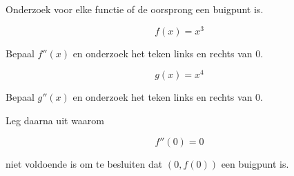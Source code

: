 \documentclass{ximera}
\begin{document}
\begin{oefening}{\oefU\ESS}

Onderzoek voor elke functie of de oorsprong een buigpunt is.

\begin{question}

\[
f(x)=x^3
\]

Bepaal $f''(x)$ en onderzoek het teken links en rechts van $0$.

\end{question}

\begin{question}

\[
g(x)=x^4
\]

Bepaal $g''(x)$ en onderzoek het teken links en rechts van $0$.

\end{question}

Leg daarna uit waarom

\[
f''(0)=0
\]

niet voldoende is om te besluiten dat $(0,f(0))$ een buigpunt is.

\end{oefening}
\end{document}
